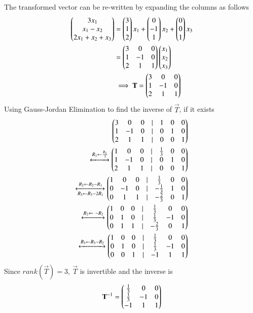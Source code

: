 The transformed vector can be re-written by expanding the columns as follows
\begin{align}
	\begin{pmatrix}3x_1\\x_1-x_2\\2x_1+x_2+x_3\end{pmatrix}
	&=\begin{pmatrix}3\\1\\2\end{pmatrix}x_1+\begin{pmatrix}0\\-1\\1\end{pmatrix}x_2+\begin{pmatrix}0\\0\\1\end{pmatrix}x_3\\
	&=\begin{pmatrix}3&0&0\\
		 1&-1&0\\
		 2&1&1\end{pmatrix}\begin{pmatrix}x_1\\x_2\\x_3\end{pmatrix} \\
	&\implies \mathbf{T}=\begin{pmatrix}3&0&0\\
                 1&-1&0\\
                 2&1&1\end{pmatrix}
\end{align}
Using Gauss-Jordan Elimination to find the inverse of $\vec{T}$, if it exists
\begin{align}
	\begin{pmatrix}3&0&0&|&1&0&0\\
	       1&-1&0&|&0&1&0\\
	       2&1&1&|&0&0&1\end{pmatrix}\\
	\xleftrightarrow[]{R_1\leftarrow\frac{R_1}{3}}
	\begin{pmatrix}1&0&0&|&\frac{1}{3}&0&0\\
               1&-1&0&|&0&1&0\\
               2&1&1&|&0&0&1\end{pmatrix}\\
	\xleftrightarrow[R_3\leftarrow R_3-2R_1]{R_2\leftarrow R_2-R_1}
	\begin{pmatrix}1&0&0&|&\frac{1}{3}&0&0\\
	       0&-1&0&|&-\frac{1}{3}&1&0\\
	       0&1&1&|&-\frac{2}{3}&0&1\end{pmatrix}\\
        \xleftrightarrow[]{R_2\leftarrow \ -R_2}
	\begin{pmatrix}1&0&0&|&\frac{1}{3}&0&0\\
               0&1&0&|&\frac{1}{3}&-1&0\\
               0&1&1&|&-\frac{2}{3}&0&1\end{pmatrix}\\
        \xleftrightarrow[]{R_3\leftarrow R_3-R_2}
	\begin{pmatrix}1&0&0&|&\frac{1}{3}&0&0\\
               0&1&0&|&\frac{1}{3}&-1&0\\
               0&0&1&|&-1&1&1\end{pmatrix}
\end{align}
Since $rank(\vec{T})=3, \ \vec{T}$ is invertible and the inverse is
\begin{align}
	\mathbf{T}^{-1}=\begin{pmatrix}\frac{1}{3}&0&0\\ 
                            \frac{1}{3}&-1&0\\
                            -1&1&1\end{pmatrix}
\end{align}
